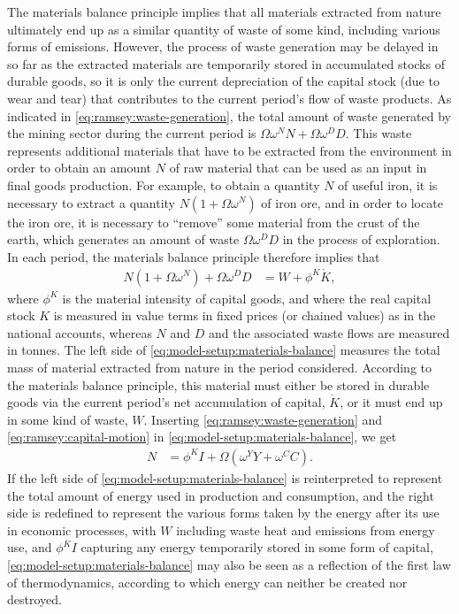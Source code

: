 The materials balance principle implies that all materials extracted from nature ultimately end up as a similar quantity of waste of some kind, including various forms of emissions. However, the process of waste generation may be delayed in so far as the extracted materials are temporarily stored in accumulated stocks of durable goods, so it is only the current depreciation of the capital stock (due to wear and tear) that contributes to the current period's flow of waste products. As indicated in \eqref{eq:ramsey:waste-generation}, the total amount of waste generated by the mining sector during the current period is $\Omega\omega^N N + \Omega\omega^D D$. This waste represents additional materials that have to be extracted from the environment in order to obtain an amount $N$ of raw material that can be used as an input in final goods production. For example, to obtain a quantity $N$ of useful iron, it is necessary to extract a quantity $N(1+\Omega\omega^N)$ of iron ore, and in order to locate the iron ore, it is necessary to ``remove'' some material from the crust of the earth, which generates an amount of waste $\Omega\omega^D D$ in the process of exploration. In each period, the materials balance principle therefore implies that
\begin{align}
N\left(1+\Omega\omega^N\right) + \Omega\omega^D D &= W + \phi^K \dot{K},
\label{eq:model-setup:materials-balance}
\end{align}
where $\phi^K$ is the material intensity of capital goods, and where the real capital stock $K$ is measured in value terms in fixed prices (or chained values) as in the national accounts, whereas $N$ and $D$ and the associated waste flows are measured in tonnes. The left side of \eqref{eq:model-setup:materials-balance} measures the total mass of material extracted from nature in the period considered. According to the materials balance principle, this material must either be stored in durable goods via the current period's net accumulation of capital, $\dot K$, or it must end up in some kind of waste, $W$. Inserting \eqref{eq:ramsey:waste-generation} and \eqref{eq:ramsey:capital-motion} in \eqref{eq:model-setup:materials-balance}, we get
\begin{align}
N &= \phi^K I + \Omega\left(\omega^Y Y + \omega^C C\right).
\label{eq:model-setup:materials-balance-reduced}
\end{align}
If the left side of \eqref{eq:model-setup:materials-balance} is reinterpreted to represent the total amount of energy used in production and consumption, and the right side is redefined to represent the various forms taken by the energy after its use in economic processes, with $W$ including waste heat and emissions from energy use, and $\phi^K I$ capturing any energy temporarily stored in some form of capital, \eqref{eq:model-setup:materials-balance} may also be seen as a reflection of the first law of thermodynamics, according to which energy can neither be created nor destroyed.


